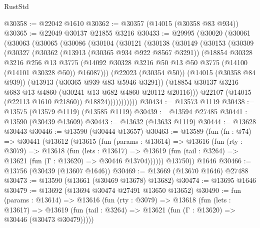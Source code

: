 \begin{lexlean}{RustStd}
\begin{coremodule}
@30358 := @22042 @1610
@30362 := @30357 (@14015 (@30358 @83 @934))
@30365 := @22049 @30137 @21855 @3216
@30433 := @29995
    (@30020
      (@30061
        (@30063
          (@30065
            (@30086
              (@30104
                (@30121
                  (@30138
                    (@30149
                      (@30153
                        (@30309
                          (@30327
                            (@30362
                              (@13913 (@30365 @934 @922 @8567 @3291))
                              (@18854
                                @30328
                                @3216
                                @256
                                @13
                                @3775
                                (@14092
                                  @30328
                                  @3216
                                  @50
                                  @13
                                  @50
                                  @3775
                                  (@14100 (@14101 @30328 @50))
                                  @16087)))
                            (@22023 (@30354 @50))
                            (@14015 (@30358 @84 @939))
                            (@13913 (@30365 @939 @83 @5946 @3291))
                            (@18854
                              @30137
                              @3216
                              @683
                              @13
                              @4860
                              (@30241 @13 @682 @4860 @20112 @20116)))
                          @22107
                          (@14015 (@22113 @1610 @21860))
                          @18824)))))))))))
@30434 := @13573 @1119
@30438 := @13575 (@13579 @1119) (@13585 @1119)
@30439 := @13594 @27485
@30441 := @13590 (@30439 @13609)
@30443 := @13632 (@13633 @1119)
@30444 := @13628 @30443
@30446 := @13590 (@30444 @13657)
@30463 := @13589
    (fun (fn : @74) =>
    @30441
      (@13612
        (@13615
          (fun (params : @13614) =>
          @13616
            (fun (rty : @3079) =>
            @13618
              (fun (lets : @13617) =>
              @13619 (fun (tail : @3264) => @13621 (fun (Γ : @13620) => @30446 @13704))))))
        @13750))
    @1646
@30466 := @13756 (@30439 (@13607 @1646))
@30469 := @13669 (@13670 @1646) @27488
@30473 := @13590 (@13661 (@30469 @13678) @13682)
@30474 := @13695 @1646
@30479 := @13692 (@13694 @30474 @27491 @13650 @13652)
@30490 := fun (params : @13614) =>
  @13616
    (fun (rty : @3079) =>
    @13618
      (fun (lets : @13617) =>
      @13619 (fun (tail : @3264) => @13621 (fun (Γ : @13620) => @30446 (@30473 @30479)))))

\end{coremodule}
\end{lexlean}
